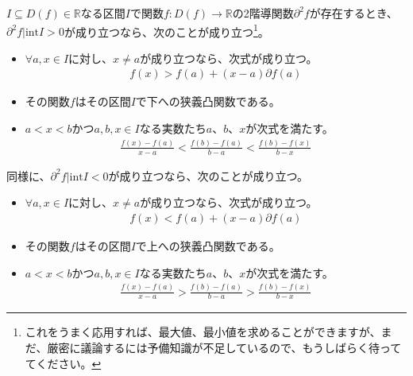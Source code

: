 \documentclass[dvipdfmx]{jsarticle}
\begin{document}
\begin{thm}\label{4.2.2.17}
$I \subseteq D(f) \in \mathbb{R}$なる区間$I$で関数$f:D(f) \rightarrow \mathbb{R}$の2階導関数$\partial^{2}f$が存在するとき、$\partial^{2}f|\mathrm{int}I > 0$が成り立つなら、次のことが成り立つ\footnote{これをうまく応用すれば、最大値、最小値を求めることができますが、まだ、厳密に議論するには予備知識が不足しているので、もうしばらく待っててください。}。
\begin{itemize}
\item
  $\forall a,x \in I$に対し、$x \neq a$が成り立つなら、次式が成り立つ。
\begin{align*}
f(x) > f(a) + (x - a)\partial f(a)
\end{align*}
\item
  その関数$f$はその区間$I$で下への狭義凸関数である。
\item
  $a < x < b$かつ$a,b,x \in I$なる実数たち$a$、$b$、$x$が次式を満たす。
\begin{align*}
\frac{f(x) - f(a)}{x - a} < \frac{f(b) - f(a)}{b - a} < \frac{f(b) - f(x)}{b - x}
\end{align*}
\end{itemize}
同様に、$\partial^{2}f|\mathrm{int}I < 0$が成り立つなら、次のことが成り立つ。
\begin{itemize}
\item
  $\forall a,x \in I$に対し、$x \neq a$が成り立つなら、次式が成り立つ。
\begin{align*}
f(x) < f(a) + (x - a)\partial f(a)
\end{align*}
\item
  その関数$f$はその区間$I$で上への狭義凸関数である。
\item
  $a < x < b$かつ$a,b,x \in I$なる実数たち$a$、$b$、$x$が次式を満たす。
\begin{align*}
\frac{f(x) - f(a)}{x - a} > \frac{f(b) - f(a)}{b - a} > \frac{f(b) - f(x)}{b - x}
\end{align*}
\end{itemize}
\end{thm}
\end{document}
